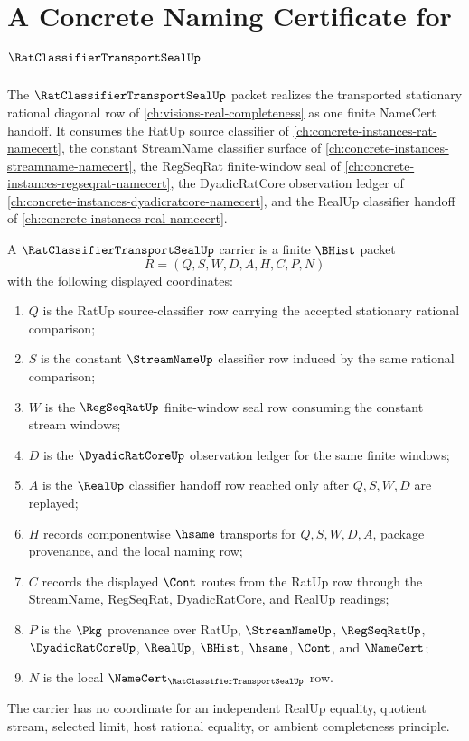 \chapter{A Concrete Naming Certificate for $\RatClassifierTransportSealUp$}
\label{ch:concrete-instances-rat-classifier-transport-seal-namecert}

The $\RatClassifierTransportSealUp$ packet realizes the transported stationary rational diagonal row of \autoref{ch:visions-real-completeness} as one finite NameCert handoff. It consumes the RatUp source classifier of \autoref{ch:concrete-instances-rat-namecert}, the constant StreamName classifier surface of \autoref{ch:concrete-instances-streamname-namecert}, the RegSeqRat finite-window seal of \autoref{ch:concrete-instances-regseqrat-namecert}, the DyadicRatCore observation ledger of \autoref{ch:concrete-instances-dyadicratcore-namecert}, and the RealUp classifier handoff of \autoref{ch:concrete-instances-real-namecert}.

\begin{definition}
\label{def:rat-classifier-transport-seal-carrier}
A $\RatClassifierTransportSealUp$ carrier is a finite $\BHist$ packet
$$
R=(Q,S,W,D,A,H,C,P,N)
$$
with the following displayed coordinates:
\begin{enumerate}
\item $Q$ is the RatUp source-classifier row carrying the accepted stationary rational comparison;
\item $S$ is the constant $\StreamNameUp$ classifier row induced by the same rational comparison;
\item $W$ is the $\RegSeqRatUp$ finite-window seal row consuming the constant stream windows;
\item $D$ is the $\DyadicRatCoreUp$ observation ledger for the same finite windows;
\item $A$ is the $\RealUp$ classifier handoff row reached only after $Q,S,W,D$ are replayed;
\item $H$ records componentwise $\hsame$ transports for $Q,S,W,D,A$, package provenance, and the local naming row;
\item $C$ records the displayed $\Cont$ routes from the RatUp row through the StreamName, RegSeqRat, DyadicRatCore, and RealUp readings;
\item $P$ is the $\Pkg$ provenance over RatUp, $\StreamNameUp$, $\RegSeqRatUp$, $\DyadicRatCoreUp$, $\RealUp$, $\BHist$, $\hsame$, $\Cont$, and $\NameCert$;
\item $N$ is the local $\NameCert_{\RatClassifierTransportSealUp}$ row.
\end{enumerate}
The carrier has no coordinate for an independent RealUp equality, quotient stream, selected limit, host rational equality, or ambient completeness principle.
\end{definition}

